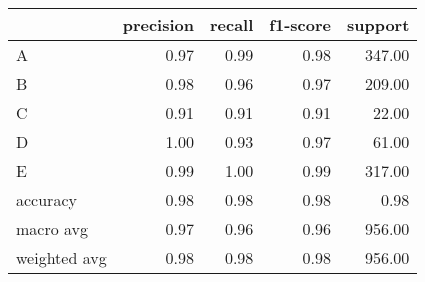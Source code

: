\begin{tabular}{|l|r|r|r|r|}
\hline
{} &  precision &  recall &  f1-score &  support \\
\hline
A            &       0.97 &    0.99 &      0.98 &   347.00 \\
B            &       0.98 &    0.96 &      0.97 &   209.00 \\
C            &       0.91 &    0.91 &      0.91 &    22.00 \\
D            &       1.00 &    0.93 &      0.97 &    61.00 \\
E            &       0.99 &    1.00 &      0.99 &   317.00 \\
accuracy     &       0.98 &    0.98 &      0.98 &     0.98 \\
macro avg    &       0.97 &    0.96 &      0.96 &   956.00 \\
weighted avg &       0.98 &    0.98 &      0.98 &   956.00 \\
\hline
\end{tabular}
